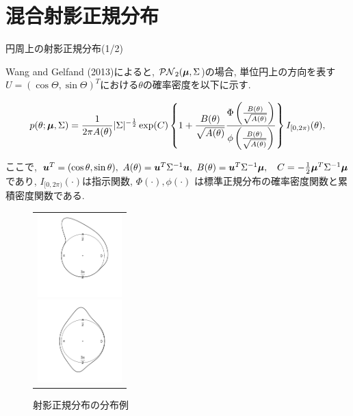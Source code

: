 \documentclass[dvipdfmx]{beamer} %
\newcommand{\bm}[1]{\mbox{\boldmath $#1$}}
\begin{document}
\section{混合射影正規分布}
\begin{frame}{円周上の射影正規分布(1/2)}

Wang and Gelfand (2013)によると, $\mathcal{PN}_2(\bm \mu,\Sigma$)の場合, 単位円上の方向を表す$U = (\cos\Theta, \sin\Theta)^T$における$\theta$の確率密度を以下に示す.

\vspace{-0.2cm}
\small
\begin{eqnarray*}
\label{PNC}
p(\theta; \bm \mu, \Sigma) = \frac{1}{2\pi A(\theta)}|\Sigma|^{-\frac{1}{2}}
\exp(C)\left\{1 + \frac{B(\theta)}{\sqrt{A(\theta)}} \frac{\Phi \left(\frac{B(\theta)}{\sqrt{A(\theta)}}\right)}{\phi \left(\frac{B(\theta)}{\sqrt{A(\theta)}}\right)}\right\} I_{[0,2\pi)}(\theta),
\end{eqnarray*}
\normalsize

\noindent
ここで, $\bm u^T = (\cos\theta,\sin\theta), \ A(\theta) = \bm u^T\Sigma^{-1}\bm u, \ B(\theta) = \bm u^T \Sigma^{-1} \bm \mu,$
$\ C = -\frac{1}{2} \bm \mu^T \Sigma^{-1} \bm \mu$であり, $I_{[0,2\pi)} (\cdot)$は指示関数, $\Phi(\cdot), \phi(\cdot)$ は標準正規分布の確率密度関数と累積密度関数である.

\begin{figure}[H]
 \begin{tabular}{c}
 \begin{minipage}{0.5\hsize}
  \begin{center}
   \includegraphics[clip,height= 32mm]{data/sample_asymmetry.png}
  \end{center}
 \end{minipage}
 \hspace{-2.0cm}
 \begin{minipage}{0.5\hsize}
  \begin{center}
 \includegraphics[clip,height= 32mm]{data/sample_bimodal.png}
  \end{center}
 \end{minipage}
\end{tabular}
\vspace{-0.2cm}
\caption{射影正規分布の分布例}
\end{figure}

\end{frame}
\end{document}
